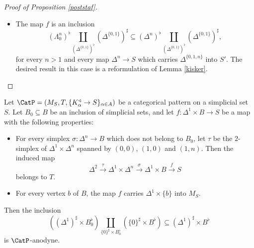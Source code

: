 \begin{proof}[Proof of Proposition \ref{poststaf}]
\begin{itemize}
\item[$(C_0)$] The map $f$ is an inclusion 
$$ (\Lambda^n_0)^{\flat} \coprod_{ (\Delta^{ \{0,1\} })^{\flat} } ( \Delta^{ \{0,1\} })^{\sharp}
\subseteq ( \Delta^n )^{\flat} \coprod_{ ( \Delta^{ \{0,1\} })^{\flat} } ( \Delta^{ \{0,1\} })^{\sharp},$$
for every $n > 1$ and every map $\Delta^n \rightarrow S$ which carries 
$\Delta^{ \{0, 1, n\} }$ into $S'$. The desired result in this case is a reformulation of
Lemma \ref{kisker}.
\end{itemize}
\end{proof}

\begin{lemma}\label{carpal}
Let $\CatP = (M_S, T, \{ K_{\alpha}^{\triangleleft} \rightarrow S \}_{\alpha \in A} )$ be a categorical
pattern on a simplicial set $S$. Let $B_0 \subseteq B$ be an inclusion of simplicial sets, and
let $f: \Delta^1 \times B \rightarrow S$ be a map with the following properties:

\begin{itemize}
\item For every simplex $\sigma: \Delta^n \rightarrow B$ which does not belong to $B_0$,
let $\tau$ be the $2$-simplex of $\Delta^1 \times \Delta^n$ spanned by
$(0,0)$, $(1,0)$ and $(1,n)$. Then the induced map
$$ \Delta^2 \stackrel{\tau}{\rightarrow} \Delta^1 \times \Delta^n
\stackrel{\sigma}{\rightarrow} \Delta^1 \times B \stackrel{f}{\rightarrow} S$$
belongs to $T$. 

\item For every vertex $b$ of $B$, the map $f$ carries $\Delta^1 \times \{b\}$ into $M_S$.
\end{itemize}

Then the inclusion 
$$((\Delta^1)^{\sharp} \times B_0^{\flat}) \coprod_{ \{0\}^{\sharp} \times B_0^{\flat} }
(\{0\}^{\sharp} \times B^{\flat}) \subseteq (\Delta^1)^{\sharp} \times B^{\flat}$$
is $\CatP$-anodyne.
\end{lemma}


